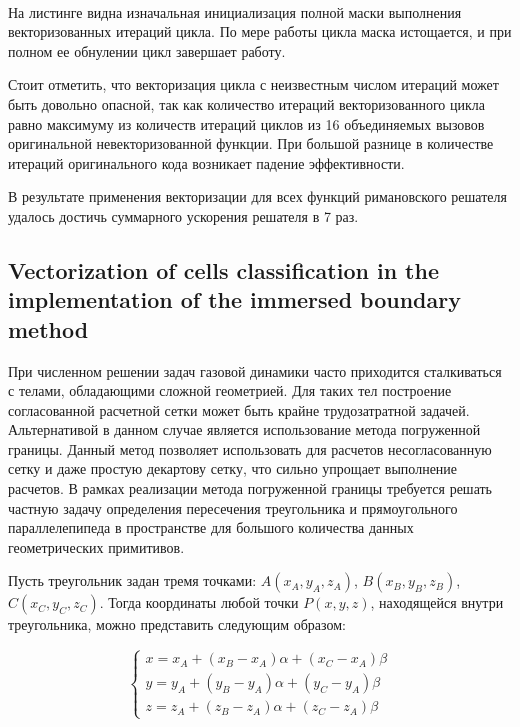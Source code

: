 \documentclass[
11pt,%
tightenlines,%
twoside,%
onecolumn,%
nofloats,%
nobibnotes,%
nofootinbib,%
superscriptaddress,%
noshowpacs,%
centertags]%
{revtex4}
\begin{document}
\ \\

На листинге видна изначальная инициализация полной маски выполнения векторизованных итераций цикла. По мере работы цикла маска истощается, и при полном ее обнулении цикл завершает работу.

Стоит отметить, что векторизация цикла с неизвестным числом итераций может быть довольно опасной, так как количество итераций векторизованного цикла равно максимуму из количеств итераций циклов из 16 объединяемых вызовов оригинальной невекторизованной функции.
При большой разнице в количестве итераций оригинального кода возникает падение эффективности.

В результате применения векторизации для всех функций римановского решателя удалось достичь суммарного ускорения решателя в 7 раз.

\subsection{Vectorization of cells classification in the implementation of the immersed boundary method}

При численном решении задач газовой динамики часто приходится сталкиваться с телами, обладающими сложной геометрией.
Для таких тел построение согласованной расчетной сетки может быть крайне трудозатратной задачей.
Альтернативой в данном случае является использование метода погруженной границы.
Данный метод позволяет использовать для расчетов несогласованную сетку и даже простую декартову сетку, что сильно упрощает выполнение расчетов.
В рамках реализации метода погруженной границы требуется решать частную задачу определения пересечения треугольника и прямоугольного параллелепипеда в пространстве для большого количества данных геометрических примитивов.

Пусть треугольник задан тремя точками: $A(x_A, y_A, z_A)$, $B(x_B, y_B, z_B)$, $C(x_C, y_C, z_C)$.
Тогда координаты любой точки $P(x, y, z)$, находящейся внутри треугольника, можно представить следующим образом:

\begin{equation}
\begin{cases}
x = x_A + (x_B - x_A)\alpha + (x_C - x_A)\beta \\
y = y_A + (y_B - y_A)\alpha + (y_C - y_A)\beta \\
z = z_A + (z_B - z_A)\alpha + (z_C - z_A)\beta
\end{cases}
\end{equation}
\end{document}
